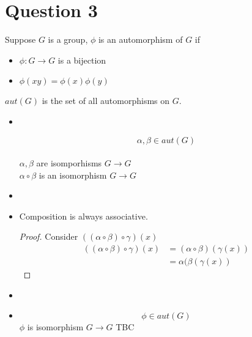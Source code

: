 \documentclass[openany]{report}
\begin{document}
\section{Question 3}
Suppose $G$ is a group, $\phi$ is an automorphism of $G$ if 
\begin{itemize}
    \item $\phi: G \rightarrow G$ is a bijection
    \item $\phi(xy) = \phi(x)\phi(y)$
\end{itemize}
$aut(G)$ is the set of all automorphisms on $G$.
\begin{itemize}
    \item \textbf{}\\
    \begin{center}
        $$\alpha, \beta \in aut(G)$$\\
        $\alpha,\beta$ are isomporhisms $G \rightarrow G$ \\
        $\alpha \circ \beta$ is an isomorphism $G \rightarrow G$
    \end{center}
    \item \textbf{\purple{}}
    \item \textbf{} Composition is always associative.
    \begin{proof}
    Consider $((\alpha \circ \beta)\circ\gamma)(x)$
    \begin{align*}
        ((\alpha \circ \beta)\circ\gamma)(x) & = (\alpha\circ\beta)(\gamma(x))\\
        & = \alpha(\beta(\gamma(x))
    \end{align*}
     \end{proof}
    \item \textbf{\purple{}}
    \item \textbf{}
    \begin{center}
    $$\phi \in aut(G)$$
    $\phi$ is isomorphism $G \rightarrow G$
    TBC
            
    \end{center}
\end{itemize}
\end{document}
